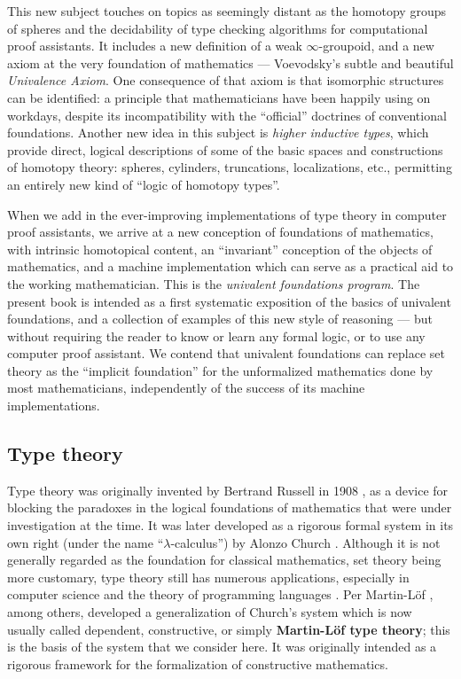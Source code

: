 {This new subject touches on topics as seemingly distant as the homotopy groups of  spheres and the decidability of type checking algorithms for computational proof assistants.  It includes a new definition of a weak $\infty$-groupoid, and a new axiom at the very foundation of mathematics --- Voevodsky's subtle and beautiful \emph{Univalence Axiom}.  One consequence of that axiom is that isomorphic structures can be identified: a principle that mathematicians have been happily using on workdays, despite its incompatibility with the ``official'' doctrines of conventional foundations.  Another new idea in this subject is \emph{higher inductive types}, which provide direct, logical descriptions of some of the basic spaces and constructions of homotopy theory: spheres, cylinders, truncations, localizations, etc., permitting an entirely new kind of ``logic of homotopy types''.

When we add in the ever-improving  implementations of type theory in computer proof assistants, we arrive at a new conception of foundations of mathematics, with intrinsic homotopical content, an ``invariant'' conception of the objects of mathematics, and a machine implementation which can serve as a practical aid to the working mathematician.  This is the \emph{univalent foundations program}.
The present book is intended as a first systematic exposition of the basics of univalent foundations, and a collection of examples of this new style of reasoning --- but without requiring the reader to know or learn any formal logic, or to use any computer proof assistant.
We contend that univalent foundations can replace set theory as the ``implicit foundation'' for the unformalized mathematics done by most mathematicians, independently of the success of its machine implementations.


\subsection*{Type theory}

Type theory was originally invented by Bertrand Russell in 1908 \cite{Russell:1908}, as a device for blocking the paradoxes in the logical foundations of mathematics  that were under investigation at the time. It was later developed as a rigorous formal system  in its own right (under the name ``$\lambda$-calculus'') by Alonzo Church \cite{Church:1933cl,Church:1940tu,Church:1941tc}.  Although it is not generally regarded as the foundation for classical mathematics, set theory being more customary, type theory still has numerous applications, especially in computer science and the theory of programming languages \cite{Pierce:2002tp}.   Per Martin-L\"{o}f \cite{MartinLof:1998tw,MartinLof:1975tb,MartinLof:1982bn,MartinLof:1984tr}, among others,
developed a generalization of Church's system which is now usually called dependent, constructive, or simply {\bf Martin\--L\"of type theory}; this is the basis of the system that we consider here. It was originally intended as a rigorous framework for the formalization of constructive mathematics.  

}
